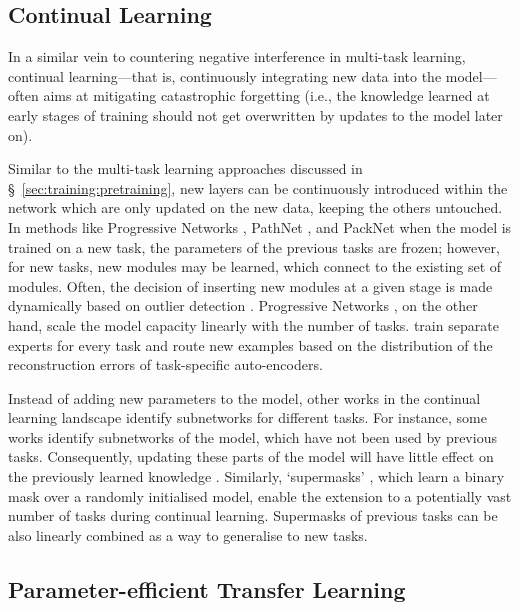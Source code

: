 \documentclass[10pt]{article} %
\begin{document}
\subsection{Continual Learning}

In a similar vein to countering negative interference in multi-task learning, continual learning---that is, continuously integrating new data into the model---often aims at mitigating catastrophic forgetting (i.e., the knowledge learned at early stages of training should not get overwritten by updates to the model later on).  

Similar to the multi-task learning approaches discussed in \S~\ref{sec:training:pretraining}, new layers can be continuously introduced within the network which are only updated on the new data, keeping the others untouched. 
In methods like Progressive Networks \citep{Rusu2016Progressive}, PathNet \citep{fernando2017pathnet}, and PackNet \citep{Mallya2018packnet} when the model is trained on a new task, the parameters of the previous tasks are frozen; however, for new tasks, new modules may be learned, which connect to the existing set of modules. 
Often, the decision of inserting new modules at a given stage is made dynamically based on outlier detection \citep{ostapenko2021continual}.
Progressive Networks \citep{Rusu2016Progressive}, on the other hand, scale the model capacity linearly with the number of tasks. 
\citet{Aljundi2017Expert} train separate experts for every task and route new examples based on the distribution of the reconstruction errors of task-specific auto-encoders.

Instead of adding new parameters to the model, other works in the continual learning landscape identify subnetworks for different tasks. For instance, some works identify subnetworks of the model, which have not been used by previous tasks. Consequently, updating these parts of the model will have little effect on the previously learned knowledge \citep{Javaloy2022Rotograd}. Similarly, `supermasks' \citep[\S \ref{sec:nature_modularity:parameter_composition};][]{wortsman2020supermasks}, which learn a binary mask over a randomly initialised model, enable the extension to a potentially vast number of tasks during continual learning. Supermasks of previous tasks can be also linearly combined as a way to generalise to new tasks.

\subsection{Parameter-efficient Transfer Learning}
\label{sec:training:posthoc}
\end{document}
